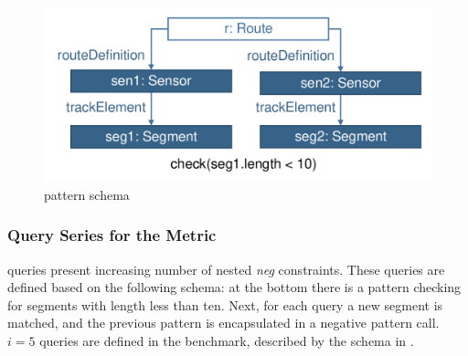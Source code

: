 \begin{figure}[Htb]
\begin{center}
    \includegraphics[scale=0.4]{figures/checks.pdf}
    \caption{ pattern schema}
    \label{fig:asechecks}
\end{center}
\end{figure}


\subsubsection{ Query Series for the  Metric}
 queries present increasing number of nested \emph{neg} constraints.
These queries are defined based on the following schema: at the bottom there is
a pattern checking for segments with length less than ten. Next, for each query
a new segment is matched, and the previous pattern is encapsulated in a negative
pattern call. $i=5$ queries are defined in the benchmark, described by the
schema in .

